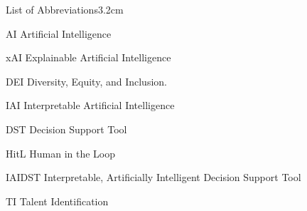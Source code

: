 \begin{mclistof}{List of Abbreviations}{3.2cm}
    \item[AI] Artificial Intelligence
    \item[xAI] Explainable Artificial Intelligence
    \item[DEI] Diversity, Equity, and Inclusion.
    \item[IAI] Interpretable Artificial Intelligence
    \item[DST] Decision Support Tool
    \item[HitL] Human in the Loop 
    \item[IAIDST] Interpretable, Artificially Intelligent Decision Support Tool
    \item[TI] Talent Identification 
\end{mclistof} 
